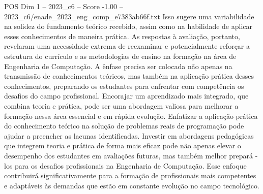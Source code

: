 \begin{textsample}{POS Dim 1 – 2023\_c6 – Score -1.00 – 2023\_c6/enade\_2023\_eng\_comp\_e7383ab66f.txt}
Isso sugere uma variabilidade na solidez do fundamento teórico recebido, assim como na habilidade de aplicar esses conhecimentos de maneira prática.
As respostas à avaliação, portanto, revelaram uma necessidade extrema de reexaminar e potencialmente reforçar a estrutura do currículo e as metodologias de ensino na formação na área de Engenharia de Computação.
A ênfase precisa ser colocada não apenas na transmissão de conhecimentos teóricos, mas também na aplicação prática desses conhecimentos, preparando os estudantes para enfrentar com competência os desafios do campo profissional.
Encorajar um aprendizado mais integrado, que combina teoria e prática, pode ser uma abordagem valiosa para melhorar a formação nessa área essencial e em rápida evolução.
Enfatizar a aplicação prática do conhecimento teórico na solução de problemas reais de programação pode ajudar a preencher as lacunas identificadas.
Investir em abordagens pedagógicas que integrem teoria e prática de forma mais eficaz pode não apenas elevar o desempenho dos estudantes em avaliações futuras, mas também melhor prepará -los para os desafios profissionais na Engenharia de Computação.
Esse enfoque contribuirá significativamente para a formação de profissionais mais competentes e adaptáveis às demandas que estão em constante evolução no campo tecnológico.

\end{textsample}
